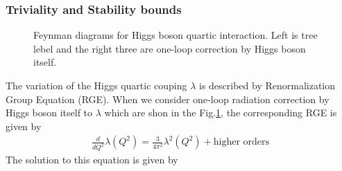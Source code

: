 \subsubsection{Triviality and Stability bounds}
\begin{figure}[t]
\centering
{}
\hspace{0.3cm}
 \hspace{0.3cm}
\hspace{0.3cm}
\caption{Feynman diagrams for Higgs boson quartic interaction. Left is tree lebel and 
the right three are one-loop correction by Higgs boson itself.} 
\label{fig:FD_triviality} 
\end{figure} 
The variation of the Higgs quartic couping $\lambda$ is described by Renormalization Group Equation (RGE). 
When we consider one-loop radiation correction by Higgs boson itself to $\lambda$ which are shon in the 
Fig.\ref{fig:FD_triviality}, the corresponding RGE is given by \cite{Djouadi20081} 
\begin{eqnarray} 
\frac{d}{dQ^2} \lambda (Q^2) 
= 
\frac{3}{4\pi^2} \lambda^2(Q^2) + \textrm{higher orders} 
\end{eqnarray} 
The solution to this equation is given by 
